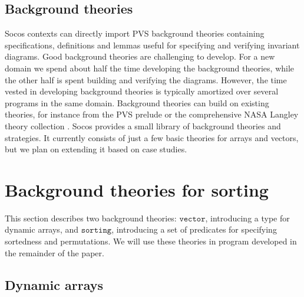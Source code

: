 \documentclass[english,submission]{eptcs}
\begin{document}
\subsection{Background theories}

Socos contexts can directly import PVS background theories containing
specifications, definitions and lemmas useful for specifying and verifying
invariant diagrams. Good background theories are challenging to develop.
For a new domain we spend about half the time developing the background
theories, while the other half is spent building and verifying the
diagrams. However, the time vested in developing background theories
is typically amortized over several programs in the same domain. Background
theories can build on existing theories, for instance from the PVS
prelude or the comprehensive NASA Langley theory collection \cite{NASALIBS}.
Socos provides a small library of background theories and strategies.
It currently consists of just a few basic theories for arrays and
vectors, but we plan on extending it based on case studies.


\section{Background theories for sorting\label{sec:Background-theories}}

This section describes two background theories: $\texttt{vector}$,
introducing a type for dynamic arrays, and $\texttt{sorting}$, introducing
a set of predicates for specifying sortedness and permutations. We
will use these theories in program developed in the remainder of the
paper.


\subsection{Dynamic arrays}
\end{document}
